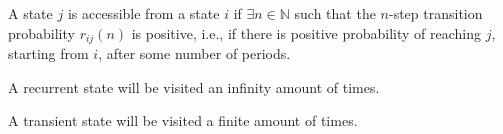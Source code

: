 \documentclass[aspectratio=169]{beamer}
\begin{document}
\begin{frame}
    \begin{definition}
        A state $j$ is accessible from a state $i$ if $\exists n\in\mathds{N}$ such that the $n$-step 
        transition probability $r_{ij}(n)$ is positive, i.e., if there is positive probability of reaching
        $j$, starting from $i$, after some number of periods.
    \end{definition}
\end{frame}

\begin{frame}
    \begin{corollary}
        A recurrent state will be visited an infinity amount of times.
    \end{corollary}

    \begin{corollary}
        A transient state will be visited a finite amount of times.
    \end{corollary}
\end{frame}
\end{document}
